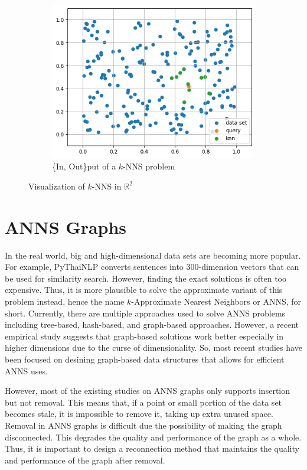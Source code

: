 \begin{figure}[ht]
\begin{subfigure}{0.32\textwidth}
        \includegraphics[width=\textwidth]{images/sim-search-final.png}
        \caption*{\{In, Out\}put of a \(k\)-NNS problem}
    \end{subfigure}
    \hfill
    \caption*{Visualization of \(k\)-NNS in \(\mathbb{R}^2\)}
\end{figure}

\section{ANNS Graphs}

In the real world, big and high-dimensional data sets are becoming more popular. For example, PyThaiNLP converts sentences into 300-dimension vectors that can be used for similarity search. However, finding the exact solutions is often too expensive. Thus, it is more plausible to solve the approximate variant of this problem instead, hence the name \(k\)-Approximate Nearest Neighbors or ANNS, for short. Currently, there are multiple approaches used to solve ANNS problems including tree-based, hash-based, and graph-based approaches. However, a recent empirical study \cite{survey2} suggests that graph-based solutions work better especially in higher dimensions due to the curse of dimensionality. So, most recent studies have been focused on desining graph-based data structures that allows for efficient ANNS uses.

However, most of the existing studies on ANNS graphs only supports insertion but not removal. This means that, if a point or small portion of the data set becomes stale, it is impossible to remove it, taking up extra unused space. Removal in ANNS graphs is difficult due the possibility of making the graph disconnected. This degrades the quality and performance of the graph as a whole. Thus, it is important to design a reconnection method that maintains the quality and performance of the graph after removal.

